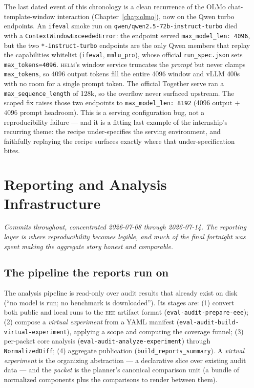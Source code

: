 \documentclass[11pt]{report}
\newcommand{\eeeshort}{\textsc{eee}\xspace}
\newcommand{\code}[1]{\texttt{#1}}
\newcommand{\file}[1]{\texttt{#1}}
\begin{document}
The last dated event of this chronology is a clean recurrence of the OLMo
chat-template-window interaction (Chapter~\ref{chap:olmo}), now on the Qwen turbo
endpoints. An \code{ifeval} smoke run on
\code{qwen/qwen2.5-72b-instruct-turbo} died with a
\code{ContextWindowExceededError}: the endpoint served \code{max\_model\_len:
4096}, but the two \code{*-instruct-turbo} endpoints are the only Qwen members that
replay the capabilities whitelist (\code{ifeval}, \code{mmlu\_pro}), whose official
\file{run\_spec.json} sets \code{max\_tokens=4096}. \textsc{helm}'s window service
truncates the \emph{prompt} but never clamps \code{max\_tokens}, so 4096 output
tokens fill the entire 4096 window and vLLM 400s with no room for a single prompt
token. The official Together serve ran a \code{max\_sequence\_length} of 128k, so
the overflow never surfaced upstream. The scoped fix raises those two endpoints to
\code{max\_model\_len: 8192} (4096 output + 4096 prompt headroom). This is a serving
configuration bug, not a reproducibility failure --- and it is a fitting last
example of the internship's recurring theme: the recipe under-specifies the
serving environment, and faithfully replaying the recipe surfaces exactly where
that under-specification bites.

\chapter{Reporting and Analysis Infrastructure}
\label{chap:reporting}

\emph{Commits throughout, concentrated 2026-07-08 through 2026-07-14. The reporting
layer is where reproducibility becomes legible, and much of the final fortnight was
spent making the aggregate story honest and comparable.}

\section{The pipeline the reports run on}

The analysis pipeline is read-only over audit results that already exist on disk
(``no model is run; no benchmark is downloaded''). Its stages are: (1) convert both
public and local runs to the \eeeshort artifact format
(\code{eval-audit-prepare-eee}); (2) compose a \emph{virtual experiment} from a
YAML manifest (\code{eval-audit-build-virtual-experiment}), applying a scope and
computing the coverage funnel; (3) per-packet core analysis
(\code{eval-audit-analyze-experiment}) through \code{NormalizedDiff}; (4) aggregate
publication (\code{build\_reports\_summary}). A \emph{virtual experiment} is the
organizing abstraction --- a declarative slice over existing audit data --- and the
\emph{packet} is the planner's canonical comparison unit (a bundle of normalized
components plus the comparisons to render between them).
\end{document}
